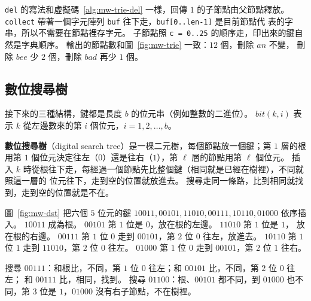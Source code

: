 \texttt{del} 的寫法和虛擬碼~\ref{alg:mw-trie-del} 一樣，回傳 $1$ 的子節點由父節點釋放。
\texttt{collect} 帶著一個字元陣列 \texttt{buf} 往下走，\texttt{buf[0..len-1]} 是目前節點代
表的字串，所以不需要在節點裡存字元。 子節點照 \texttt{c = 0..25} 的順序走，印出來的鍵自
然是字典順序。 輸出的節點數和圖~\ref{fig:mw-trie} 一致：$12$ 個，刪除 $\mathit{an}$ 不變，
刪除 $\mathit{bee}$ 少 $2$ 個，刪除 $\mathit{bad}$ 再少 $1$ 個。

\subsection{數位搜尋樹}
\label{sec:mw-dst}

接下來的三種結構，鍵都是長度 $b$ 的位元串（例如整數的二進位）。 $\mathit{bit}(k, i)$ 表示
$k$ 從左邊數來的第 $i$ 個位元，$i = 1, 2, \ldots, b$。

\textbf{數位搜尋樹}（digital search tree）是一棵二元樹，每個節點放一個鍵；第 $1$ 層的根
用第 $1$ 個位元決定往左（$0$）還是往右（$1$），第 $\ell$ 層的節點用第 $\ell$ 個位元。
插入 $k$ 時從根往下走，每經過一個節點先比整個鍵（相同就是已經在樹裡），不同就照這一層的
位元往下，走到空的位置就放進去。 搜尋走同一條路，比到相同就找到，走到空的位置就是不在。


圖~\ref{fig:mw-dst} 把六個 $5$ 位元的鍵 $10011, 00101, 11010, 00111, 10110, 01000$ 依序插
入。 $10011$ 成為根。 $00101$ 第 $1$ 位是 $0$，放在根的左邊。 $11010$ 第 $1$ 位是 $1$，
放在根的右邊。 $00111$ 第 $1$ 位 $0$ 走到 $00101$，第 $2$ 位 $0$ 往左，放進去。
$10110$ 第 $1$ 位 $1$ 走到 $11010$，第 $2$ 位 $0$ 往左。 $01000$ 第 $1$ 位 $0$ 走到
$00101$，第 $2$ 位 $1$ 往右。

\begin{center}
\label{fig:mw-dst}
\end{center}

搜尋 $00111$：和根比，不同，第 $1$ 位 $0$ 往左；和 $00101$ 比，不同，第 $2$ 位 $0$ 往左；
和 $00111$ 比，相同，找到。 搜尋 $01100$：根、$00101$ 都不同，到 $01000$ 也不同，第 $3$
位是 $1$，$01000$ 沒有右子節點，不在樹裡。

